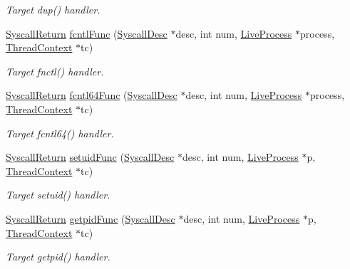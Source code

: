 \begin{DoxyCompactItemize}
\begin{DoxyCompactList}\small\item\em Target dup() handler. \item\end{DoxyCompactList}\item 
\hyperlink{classSyscallReturn}{SyscallReturn} \hyperlink{syscall__emul_8hh_a78ca4a2b9dba73eeb4fb283cc95a25e9}{fcntlFunc} (\hyperlink{classSyscallDesc}{SyscallDesc} $\ast$desc, int num, \hyperlink{classLiveProcess}{LiveProcess} $\ast$process, \hyperlink{classThreadContext}{ThreadContext} $\ast$tc)
\begin{DoxyCompactList}\small\item\em Target fnctl() handler. \item\end{DoxyCompactList}\item 
\hyperlink{classSyscallReturn}{SyscallReturn} \hyperlink{syscall__emul_8hh_a6e50686b7758443953966999dcd80f40}{fcntl64Func} (\hyperlink{classSyscallDesc}{SyscallDesc} $\ast$desc, int num, \hyperlink{classLiveProcess}{LiveProcess} $\ast$process, \hyperlink{classThreadContext}{ThreadContext} $\ast$tc)
\begin{DoxyCompactList}\small\item\em Target fcntl64() handler. \item\end{DoxyCompactList}\item 
\hyperlink{classSyscallReturn}{SyscallReturn} \hyperlink{syscall__emul_8hh_a5dc53a9bd2d0fac6fedb24a8e50c375d}{setuidFunc} (\hyperlink{classSyscallDesc}{SyscallDesc} $\ast$desc, int num, \hyperlink{classLiveProcess}{LiveProcess} $\ast$p, \hyperlink{classThreadContext}{ThreadContext} $\ast$tc)
\begin{DoxyCompactList}\small\item\em Target setuid() handler. \item\end{DoxyCompactList}\item 
\hyperlink{classSyscallReturn}{SyscallReturn} \hyperlink{syscall__emul_8hh_afd43d1edeba9c138731579129c0e9a47}{getpidFunc} (\hyperlink{classSyscallDesc}{SyscallDesc} $\ast$desc, int num, \hyperlink{classLiveProcess}{LiveProcess} $\ast$p, \hyperlink{classThreadContext}{ThreadContext} $\ast$tc)
\begin{DoxyCompactList}\small\item\em Target getpid() handler. \item\end{DoxyCompactList}\item 

\end{DoxyCompactItemize}
